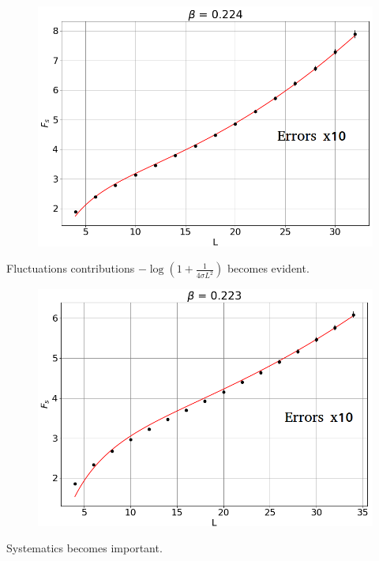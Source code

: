 \documentclass[12pt,handout]{beamer}
\begin{document}
\begin{frame}
\begin{center}
\begin{figure}[!htb]
\centering
\includegraphics[scale=0.4, center]{0224.png}
\end{figure}
Fluctuations contributions $- \log \left( 1 + \frac{1}{4 \sigma L^2} \right)$ becomes evident.
\end{center}
\end{frame}

\begin{frame}
\begin{center}
\begin{figure}[!htb]
\centering
\includegraphics[scale=0.4, center]{0223.png}
\end{figure}
Systematics becomes important.
\end{center}
\end{frame}
\end{document}
